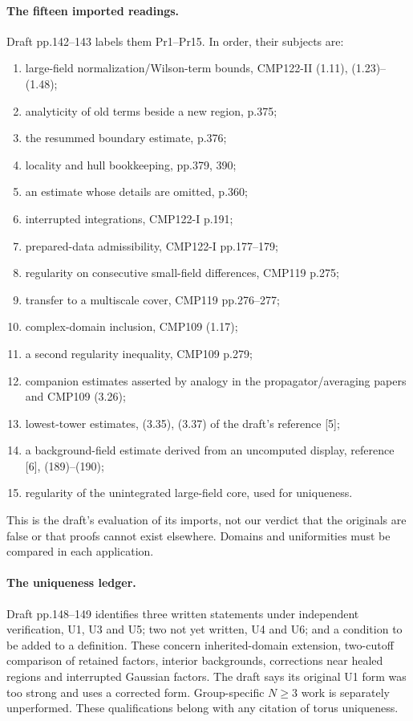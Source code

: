 \documentclass[11pt]{article}
\theoremstyle{remark}
\begin{document}
\paragraph{The fifteen imported readings.}
Draft pp.142--143 labels them Pr1--Pr15. In order,
their subjects are:
\begin{enumerate}
\item large-field normalization/Wilson-term bounds,
CMP122-II (1.11), (1.23)--(1.48);
\item analyticity of old terms beside a new region, p.375;
\item the resummed boundary estimate, p.376;
\item locality and hull bookkeeping, pp.379, 390;
\item an estimate whose details are omitted, p.360;
\item interrupted integrations, CMP122-I p.191;
\item prepared-data admissibility, CMP122-I pp.177--179;
\item regularity on consecutive small-field differences,
CMP119 p.275;
\item transfer to a multiscale cover, CMP119 pp.276--277;
\item complex-domain inclusion, CMP109 (1.17);
\item a second regularity inequality, CMP109 p.279;
\item companion estimates asserted by analogy in the
propagator/averaging papers and CMP109 (3.26);
\item lowest-tower estimates, (3.35), (3.37) of
the draft's reference [5];
\item a background-field estimate derived from an
uncomputed display, reference [6], (189)--(190);
\item regularity of the unintegrated large-field core,
used for uniqueness.
\end{enumerate}
This is the draft's evaluation of its imports, not
our verdict that the originals are false or that
proofs cannot exist elsewhere. Domains and uniformities
must be compared in each application.

\paragraph{The uniqueness ledger.}
Draft pp.148--149 identifies three written statements
under independent verification, U1, U3 and U5;
two not yet written, U4 and U6; and a condition to
be added to a definition. These concern inherited-domain
extension, two-cutoff comparison of retained factors,
interior backgrounds, corrections near healed regions
and interrupted Gaussian factors. The draft says its
original U1 form was too strong and uses a corrected
form. Group-specific \(N\geq3\) work is separately
unperformed. These qualifications belong with any
citation of torus uniqueness.
\end{document}
